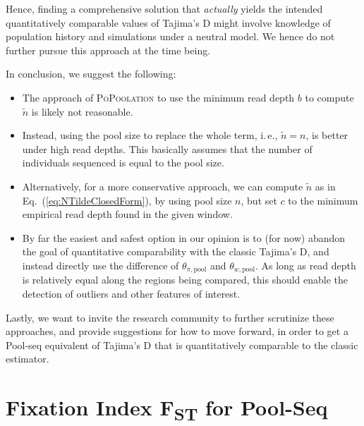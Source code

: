 \documentclass[letterpaper,fontsize=9pt,DIV=12]{scrartcl}
\newcommand\toolname{\textsc}
\newcommand\eqnref[1]{Eq.~(\ref{#1})}
\newcommand{\fst}{F\textsubscript{ST}}
\begin{document}
Hence, finding a comprehensive solution that \emph{actually} yields the intended quantitatively comparable values of Tajima's D might involve knowledge of population history and simulations under a neutral model. We hence do not further pursue this approach at the time being.

In conclusion, we suggest the following: 

\begin{itemize}
    \item The approach of \toolname{PoPoolation} to use the minimum read depth $b$ to compute $\tilde{n}$ is likely not reasonable.
    \item Instead, using the pool size to replace the whole term, i.\,e., $\tilde{n} = n$, is better under high read depths. This basically assumes that the number of individuals sequenced is equal to the pool size.
    \item Alternatively, for a more conservative approach, we can compute $\tilde{n}$ as in \eqnref{eq:NTildeClosedForm}, by using pool size $n$, but set $c$ to the minimum empirical read depth found in the given window.
    \item By far the easiest and safest option in our opinion is to (for now) abandon the goal of quantitative comparability with the classic Tajima's D, and instead directly use the difference of $\theta_{\pi,\text{pool}}$ and $\theta_{w, \text{pool}}$.  As long as read depth is relatively equal along the regions being compared, this should enable the detection of outliers and other features of interest.
\end{itemize}

Lastly, we want to invite the research community to further scrutinize these approaches, and provide suggestions for how to move forward, in order to get a Pool-seq equivalent of Tajima's D that is quantitatively comparable to the classic estimator.


\section{Fixation Index \texorpdfstring{\fst}{FST} for Pool-Seq}
\label{supp:sec:FST}
\end{document}
